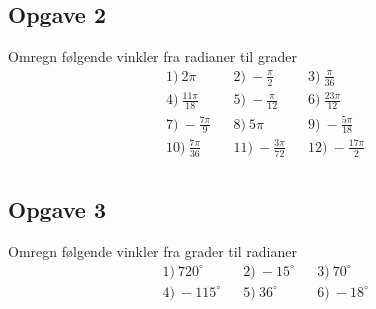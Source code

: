 \subsection*{Opgave 2}
Omregn følgende vinkler fra radianer til grader
\begin{align*}
	&1) \ 2\pi &   &2) \ -\frac{\pi}{2}  &  &3) \ \frac{\pi}{36}  \\
	&4) \ \frac{11\pi}{18} &   &5) \ -\frac{\pi}{12}   &  &6) \ \frac{23\pi}{12}  \\
	&7) \ -\frac{7\pi}{9} &   &8) \ 5\pi  &  &9) \ -\frac{5\pi}{18}  \\
	&10) \ \frac{7\pi}{36} &   &11) \ -\frac{3\pi}{72}  &  &12) \ -\frac{17\pi}{2}  \\
\end{align*}

\subsection*{Opgave 3}
Omregn følgende vinkler fra grader til radianer
\begin{align*}
	&1) \ 720^\circ &   &2) \ -15^\circ  &  &3) \ 70^\circ  \\
	&4) \ -115^\circ &   &5) \ 36^\circ   &  &6) \ -18^\circ
\end{align*}

